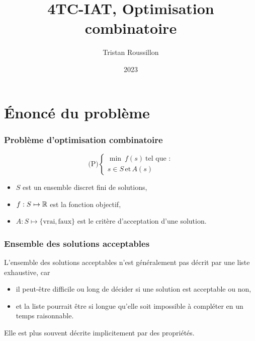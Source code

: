 \documentclass{beamer}
\title[]
 {4TC-IAT, Optimisation combinatoire}
\author[T. Roussillon]
 {Tristan Roussillon}
\date{2023}
\institute{INSA Lyon, TC}
\newcommand{\R}{{\ensuremath\mathbb{R}}}
\begin{document}
\begin{frame}
  \titlepage
\end{frame}

\section{\'Enoncé du problème}

\begin{frame}
  \frametitle{Problème d'optimisation combinatoire}

  \[
  \text{(P)} \left\{
  \begin{array}{c}
    \min \ f(s) \ \text{tel que :} \\
    s \in S \, \text{et} \, A(s)
  \end{array}
  \right.
  \]

  \begin{itemize}
  \item $S$ est un ensemble discret fini de solutions,
  \item $f : S \mapsto \R$ est la fonction objectif,
  \item $A : S \mapsto \{\text{vrai},\text{faux}\}$ est le critère d'acceptation d'une solution. 
  \end{itemize}
\end{frame}

\begin{frame}
  \frametitle{Ensemble des solutions acceptables}

  L'ensemble des solutions acceptables n'est généralement pas décrit par une liste exhaustive, car

  \begin{itemize}
  \item il peut-être difficile ou long de décider si une solution est acceptable ou non,
  \item et la liste pourrait être si longue qu'elle soit impossible à compléter en un temps raisonnable. 
  \end{itemize}
  
  Elle est plus souvent décrite implicitement par des propriétés.  

\end{frame}
\end{document}
